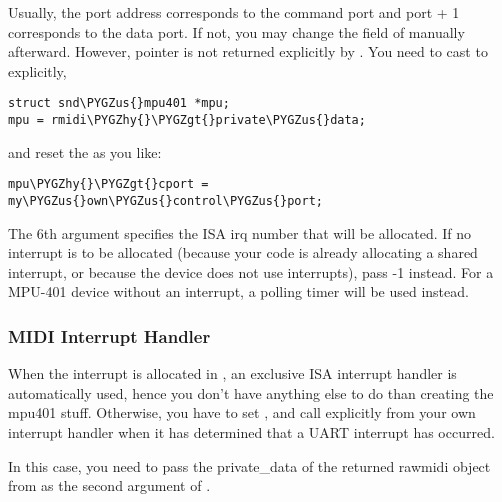 \documentclass[a4paper,8pt,english]{sphinxmanual}
\def\PYGZus{\char`\_}
\def\PYGZgt{\char`\>}
\def\PYGZhy{\char`\-}
\begin{document}
Usually, the port address corresponds to the command port and port + 1
corresponds to the data port. If not, you may change the 
field of  manually afterward.
However,  pointer is
not returned explicitly by {\hyperref[sound/kernel\string-api/alsa\string-driver\string-api:c.snd_mpu401_uart_new]{\emph{}}}. You
need to cast  to  explicitly,

\begin{Verbatim}[commandchars=\\\{\}]
struct snd\PYGZus{}mpu401 *mpu;
mpu = rmidi\PYGZhy{}\PYGZgt{}private\PYGZus{}data;
\end{Verbatim}

and reset the  as you like:

\begin{Verbatim}[commandchars=\\\{\}]
mpu\PYGZhy{}\PYGZgt{}cport = my\PYGZus{}own\PYGZus{}control\PYGZus{}port;
\end{Verbatim}

The 6th argument specifies the ISA irq number that will be allocated. If
no interrupt is to be allocated (because your code is already allocating
a shared interrupt, or because the device does not use interrupts), pass
-1 instead. For a MPU-401 device without an interrupt, a polling timer
will be used instead.


\subsubsection{MIDI Interrupt Handler}
\label{sound/kernel-api/writing-an-alsa-driver:midi-interrupt-handler}
When the interrupt is allocated in
{\hyperref[sound/kernel\string-api/alsa\string-driver\string-api:c.snd_mpu401_uart_new]{\emph{}}}, an exclusive ISA interrupt
handler is automatically used, hence you don't have anything else to do
than creating the mpu401 stuff. Otherwise, you have to set
, and call
{\hyperref[sound/kernel\string-api/alsa\string-driver\string-api:c.snd_mpu401_uart_interrupt]{\emph{}}} explicitly from your own
interrupt handler when it has determined that a UART interrupt has
occurred.

In this case, you need to pass the private\_data of the returned rawmidi
object from {\hyperref[sound/kernel\string-api/alsa\string-driver\string-api:c.snd_mpu401_uart_new]{\emph{}}} as the second
argument of {\hyperref[sound/kernel\string-api/alsa\string-driver\string-api:c.snd_mpu401_uart_interrupt]{\emph{}}}.
\end{document}
